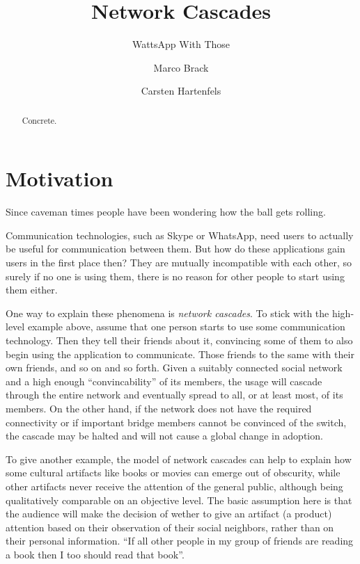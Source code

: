 \documentclass{sig-alternate-05-2015}
\begin{document}
\title{Network Cascades}
\subtitle{WattsApp With Those}
\author{Marco Brack \and Carsten Hartenfels}
\maketitle


\begin{abstract}
Concrete.
\end{abstract}


\section{Motivation}\label{sec:motivation}

Since caveman times people have been wondering how the ball gets rolling.

Communication technologies, such as Skype or WhatsApp, need users to actually be useful for communication between them. But how do these applications gain users in the first place then? They are mutually incompatible with each other, so surely if no one is using them, there is no reason for other people to start using them either.

One way to explain these phenomena is \emph{network cascades}. To stick with the high-level example above, assume that one person starts to use some communication technology. Then they tell their friends about it, convincing some of them to also begin using the application to communicate. Those friends to the same with their own friends, and so on and so forth. Given a suitably connected social network and a high enough ``convincability'' of its members, the usage will cascade through the entire network and eventually spread to all, or at least most, of its members. On the other hand, if the network does not have the required connectivity or if important bridge members cannot be convinced of the switch, the cascade may be halted and will not cause a global change in adoption.

To give another example, the model of network cascades can help to explain how some cultural artifacts like books or movies can emerge out of obscurity, while other artifacts never receive the attention of the general public, although being qualitatively comparable on an objective level. The basic assumption here is that the audience will make the decision of wether to give an artifact (a product) attention based on their observation of their social neighbors, rather than on their personal information. ``If all other people in my group of friends are reading a book then I too should read that book''.
\end{document}
